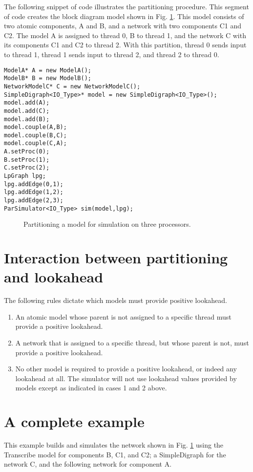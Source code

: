 The following snippet of code illustrates the partitioning procedure. This segment of code creates the block diagram model shown in Fig. \ref{fig:partition_example}. This model consists of two atomic components, A and B, and a network with two components C1 and C2. The model A is assigned to thread 0, B to thread 1, and the network C with its components C1 and C2 to thread 2. With this partition, thread 0 sends input to thread 1, thread 1 sends input to thread 2, and thread 2 to thread 0. 
\begin{verbatim}
ModelA* A = new ModelA();
ModelB* B = new ModelB();
NetworkModelC* C = new NetworkModelC();
SimpleDigraph<IO_Type>* model = new SimpleDigraph<IO_Type>();
model.add(A);
model.add(C);
model.add(B);
model.couple(A,B);
model.couple(B,C);
model.couple(C,A);
A.setProc(0);
B.setProc(1);
C.setProc(2);
LpGraph lpg;
lpg.addEdge(0,1);
lpg.addEdge(1,2);
lpg.addEdge(2,3);
ParSimulator<IO_Type> sim(model,lpg);
\end{verbatim}
\begin{figure}[ht]
\centering
{}
\caption{Partitioning a model for simulation on three processors.}
\label{fig:partition_example}
\end{figure}

\section{Interaction between partitioning and lookahead}
The following rules dictate which models must provide positive lookahead.
\begin{enumerate}
\item An atomic model whose parent is not assigned to a specific thread must provide a positive lookahead.
\item A network that is assigned to a specific thread, but whose parent is not, must provide a positive lookahead. 
\item No other model is required to provide a positive lookahead, or indeed any lookahead at all. The simulator will not use lookahead values provided by models except as indicated in cases 1 and 2 above.
\end{enumerate}

\section{A complete example}
This example builds and simulates the network shown in Fig. \ref{fig:partition_example} using the Transcribe model for components B, C1, and C2; a SimpleDigraph for the network C, and the following network for component A.

